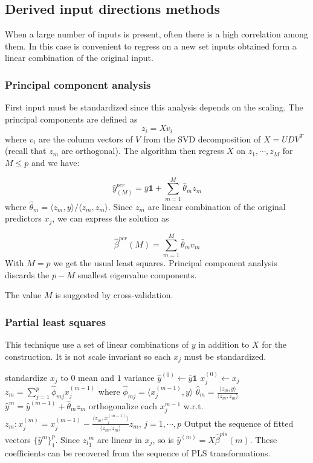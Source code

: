 \documentclass[12pt, letterpaper]{article}
\theoremstyle{definition}
\begin{document}
\subsection{Derived input directions methods}
When a large number of inputs is present, often there is a high correlation among them. In this case is convenient to regress on a new set inputs obtained form a linear combination of the original input.

\subsubsection{Principal component analysis}
First input must be standardized since this analysis depends on the scaling. The principal components are defined as  	
\begin{equation}
z_i = X v_i
\end{equation}
where $v_i$ are the column vectors of $V$ from the SVD decomposition of $X=UDV^T$ (recall that $z_m$ are orthogonal). The algorithm then regress $X$ on $z_1,\cdots, z_M$ for $M\le p$ and we have:

\begin{equation}
\hat{y}^{pcr}_{(M)} = \bar{y}\mathbf{1} + \sum_{m=1}^M \hat{\theta}_m z_m
\end{equation}
where $\hat{\theta}_m = \langle z_m, y\rangle/\langle z_m, z_m \rangle$. Since $z_m$ are linear combination of the original predictors $x_j$, we can express the solution as 

\begin{equation}
\hat{\beta}^{pcr}(M) = \sum_{m=1}^{M} \hat{\theta}_m v_m
\end{equation}
With $M=p$ we get the usual least squares. Principal component analysis discards the $p-M$ smallest eigenvalue components.

The value $M$ is suggested by cross-validation.
\subsubsection{Partial least squares}
This technique use a set of linear combinations of $y$ in addition to $X$ for the construction. It is not scale invariant so each $x_j$ must be standardized.
\begin{algorithm}
standardize $x_j$ to $0$ mean and $1$ variance\;
$\hat{y}^{(0)}\leftarrow \bar{y}\mathbf{1}$\;
$x_j^{(0)} \leftarrow x_j$ \;
{
    $z_m  = \sum_{j=1}^p \hat{\phi}_{mj} x_j^{(m-1)}$ where $\hat{\phi}_{mj} = \langle x_j^{(m-1)}, y\rangle$ \; 
    $\hat{\theta}_m = \frac{\langle z_m, y\rangle}{\langle z_m, z_m\rangle} $\;
    $\hat{y}^m = \hat{y}^{(m-1)} + \hat{\theta}_m z_m$\;
    orthogonalize each $x_j^{m-1}$ w.r.t. $z_m: x_j^{(m)} = x_j^{(m-1)} - \frac{\langle z_m, x_j^{(m-1)}\rangle}{\langle z_m, z_m\rangle} z_m$, $j=1,\cdots, p$\;
}
Output the sequence of fitted vectors $\{\hat{y}^m\}_1^p$. Since ${z_l}_1^m$ are linear in $x_j$, so is $\hat{y}^{(m)} = X \hat{\beta}^{pls}(m)$. These coefficients can be recovered from the sequence of PLS transformations.
\end{algorithm}
\end{document}
